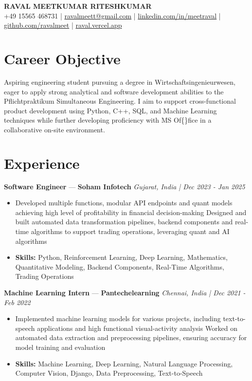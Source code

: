\documentclass[a4paper,10pt]{article}
\begin{document}
\begin{center}
  {\Large\bfseries RAVAL MEETKUMAR RITESHKUMAR}\\[2pt]
  {\small +49 15565 468731 \;|\; \href{mailto:ravalmeett@gmail.com}{ravalmeett@gmail.com} \;|\; \href{https://www.linkedin.com/in/meetraval/}{linkedin.com/in/meetraval} \;|\; \href{https://github.com/ravalmeet}{github.com/ravalmeet} \;|\; \href{https://raval.vercel.app/}{raval.vercel.app}}
\end{center}
\vspace{-3pt}

\section*{Career Objective}
Aspiring engineering student pursuing a degree in Wirtschaftsingenieurwesen, eager to apply strong analytical and software development abilities to the Pflichtpraktikum Simultaneous Engineering. I aim to support cross-functional product development using Python, C++, SQL, and Machine Learning techniques while further developing proficiency with MS Of\{\}fice in a collaborative on-site environment.\par

\section*{Experience}
\textbf{Software Engineer} — \textbf{Soham Infotech} \hfill \textit{Gujarat, India \;|\; Dec 2023 - Jan 2025}\par
\vspace{1pt}
\begin{itemize}
  \item Developed multiple functions, modular API endpoints and quant models achieving high level of profitability in financial decision-making Designed and built automated data transformation pipelines, backend components and real-time algorithms to support trading operations, leveraging quant and AI algorithms
  \item \textbf{Skills:} Python, Reinforcement Learning, Deep Learning, Mathematics, Quantitative Modeling, Backend Components, Real-Time Algorithms, Trading Operations
\end{itemize}
\vspace{3pt}
\textbf{Machine Learning Intern} — \textbf{Pantechelearning} \hfill \textit{Chennai, India \;|\; Dec 2021 - Feb 2022}\par
\vspace{1pt}
\begin{itemize}
  \item Implemented machine learning models for various projects, including text-to-speech applications and high functional visual-activity analysis Worked on automated data extraction and preprocessing pipelines, ensuring accuracy for model training and evaluation
  \item \textbf{Skills:} Machine Learning, Deep Learning, Natural Language Processing, Computer Vision, Django, Data Preprocessing, Text-to-Speech
\end{itemize}
\end{document}

